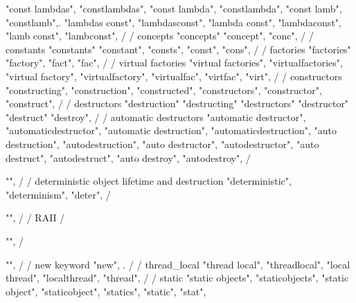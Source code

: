 {{{        "const lambdas",
        "constlambdas",
        "const lambda",
        "constlambda",
        "const lamb",
        "constlamb",.
        "lambdas const",
        "lambdasconst",
        "lambda const",
        "lambdaconst",
        "lamb const",
        "lambconst",
        /
        / concepts 
        "concepts"
        "concept",
        "conc",
        /
        / constants 
        "constants"
        "constant",
        "consts",
        "const", 
        "cons",
        /
        / factories 
        "factories"
        "factory",
        "fact",
        "fac",
        /
        / virtual factories 
        "virtual factories",  
        "virtualfactories",  
        "virtual factory",  
        "virtualfactory",  
        "virtualfac",  
        "virtfac",  
        "virt",  
        /
        / constructors 
        "constructing",
        "construction",
        "constructed",
        "constructors",
        "constructor",
        "construct",
        /
        / destructors
        "destruction" 
        "destructing" 
        "destructors" 
        "destructor" 
        "destruct" 
        "destroy", 
        /
        / automatic destructors 
        "automatic destructor",  
        "automaticdestructor",  
        "automatic destruction", 
        "automaticdestruction", 
        "auto destruction",  
        "autodestruction",  
        "auto destructor",  
        "autodestructor",  
        "auto destruct",  
        "autodestruct",  
        "auto destroy",  
        "autodestroy",  
        / {"", 
        /
        / deterministic object lifetime and destruction
        "deterministic",  
        "determinism",  
        "deter",  
        / {"", 
        /
        / RAII 
        /{"",  
        /{"", 
        /
        / new keyword 
        "new", . 
        /
        / thread_local
        "thread local",
        "threadlocal",
        "local thread",
        "localthread",
        "thread",
        /
        / static 
        "static objects",
        "staticobjects",
        "static object",
        "staticobject",
        "statics",
        "static",
        "stat", 
        
}}}}}}}
